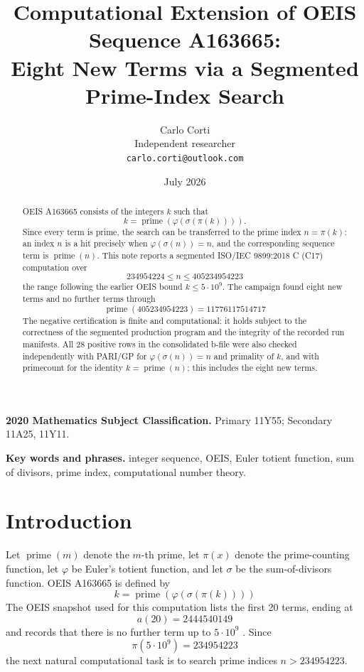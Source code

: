 \documentclass[11pt]{article}
\title{Computational Extension of OEIS Sequence A163665:\\
Eight New Terms via a Segmented Prime-Index Search}
\author{Carlo Corti\\
Independent researcher\\
\texttt{carlo.corti@outlook.com}}
\date{July 2026}
\theoremstyle{definition}
\theoremstyle{remark}
\newcommand{\seqid}{A163665}
\begin{document}
\maketitle

\begin{abstract}
OEIS \seqid{} consists of the integers \(k\) such that
\[
  k=\operatorname{prime}(\varphi(\sigma(\pi(k)))).
\]
Since every term is prime, the search can be transferred to the prime
index \(n=\pi(k)\): an index \(n\) is a hit precisely when
\(\varphi(\sigma(n))=n\), and the corresponding sequence term is
\(\operatorname{prime}(n)\).  This note reports a segmented
ISO/IEC 9899:2018 C (C17) \cite{isoC17}
computation over
\[
  234954224 \leq n \leq 405234954223
\]
the range following the earlier OEIS bound \(k \leq 5\cdot 10^9\).
The campaign found eight new terms and no further terms through
\[
  \operatorname{prime}(405234954223)=11776117514717
\]
The negative certification is finite and computational: it holds subject
to the correctness of the segmented production program and the integrity
of the recorded run manifests.  All 28 positive rows in the consolidated
b-file were also checked independently with PARI/GP for
\(\varphi(\sigma(n))=n\) and primality of \(k\), and with primecount for
the identity
\(k=\operatorname{prime}(n)\); this includes the eight new terms.
\end{abstract}

\noindent\textbf{2020 Mathematics Subject Classification.}
Primary 11Y55; Secondary 11A25, 11Y11.

\noindent\textbf{Key words and phrases.}
integer sequence, OEIS, Euler totient function, sum of divisors,
prime index, computational number theory.

\section{Introduction}

Let \(\operatorname{prime}(m)\) denote the \(m\)-th prime, let \(\pi(x)\)
denote the prime-counting function, let \(\varphi\) be Euler's totient
function, and let \(\sigma\) be the sum-of-divisors function.  OEIS
\seqid{} is defined by
\[
  k=\operatorname{prime}(\varphi(\sigma(\pi(k))))
\]
The OEIS snapshot used for this computation lists the first 20 terms,
ending at
\[
  a(20)=2444540149
\]
and records that there is no further term up to \(5\cdot 10^9\)
\cite{oeisA163665}.  Since
\[
  \pi(5\cdot 10^9)=234954223
\]
the next natural computational task is to search prime indices
\(n>234954223\).
\end{document}
